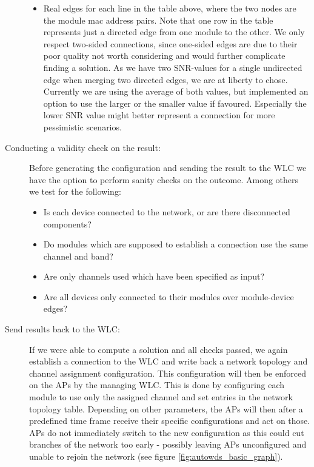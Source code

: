 \begin{description}
\begin{itemize}
	    \item Real edges for each line in the table above, where the two nodes are the module mac address pairs. 
	      Note that one row in the table represents just a directed edge from one module to the other. 
	      We only respect two-sided connections, since one-sided edges are due to their poor quality not worth considering and would further complicate finding a solution.
	      As we have two \ac{SNR}-values for a single undirected edge when merging two directed edges, we are at liberty to chose.
	      Currently we are using the average of both values, but implemented an option to use the larger or the smaller value if favoured.
	      Especially the lower \ac{SNR} value might better represent a connection for more pessimistic scenarios.
	  \end{itemize}

	\item[Conducting a validity check on the result:\newline]
	  Before generating the configuration and sending the result to the \ac{WLC} we have the option to perform sanity checks on the outcome.
	  Among others we test for the following:
	  \begin{itemize}
	    \item Is each device connected to the network, or are there disconnected components?
	    \item Do modules which are supposed to establish a connection use the same channel and band?
	    \item Are only channels used which have been specified as input?
	    \item Are all devices only connected to their modules over module-device edges?
	  \end{itemize}
	  
	\item [Send results back to the \ac{WLC}:]
	  If we were able to compute a solution and all checks passed, we again establish a connection to the \ac{WLC} and write back a network topology and channel assignment
	  configuration. This configuration will then be enforced on the APs by the managing \ac{WLC}.
	  This is done by configuring each module to use only the assigned channel and set entries in the network topology table. 
	  Depending on other parameters, the APs will then after a predefined time frame receive their specific configurations and act on those.
	  APs do not immediately switch to the new configuration as this could cut branches of the network too early - possibly leaving APs 
	  unconfigured and unable to rejoin the network (see figure \ref{fig:autowds_basic_graph}).
	  
      \end{description}
      
